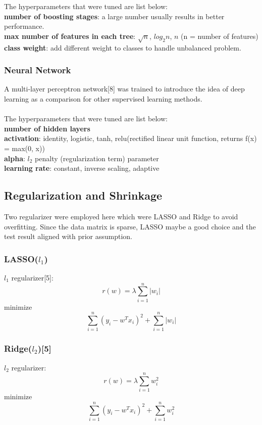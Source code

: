\documentclass{article}
\begin{document}
The hyperparameters that were tuned are list below:\\
\textbf{number of boosting stages}: a large number usually results in better performance.\\
\textbf{max number of features in each tree}: $\sqrt{n}$, $log_2{n}$, $n$ (n = number of features)\\
\textbf{class weight}: add different weight to classes to handle unbalanced problem.

\subsubsection{Neural Network}
A multi-layer perceptron network[8] was trained to introduce the idea of deep learning as a comparison for other supervised learning methods.\\
\\
The hyperparameters that were tuned are list below:\\
\textbf{number of hidden layers}\\
\textbf{activation}: identity, logistic, tanh, relu(rectified linear unit function, returns f(x) = max(0, x))\\
\textbf{alpha}: $l_2$ penalty (regularization term) parameter\\
\textbf{learning rate}: constant, inverse scaling, adaptive\\

\subsection{Regularization and Shrinkage}
Two regularizer were employed here which were LASSO and Ridge to avoid overfitting. Since the data matrix is sparse, LASSO maybe a good choice and the test result aligned with prior assumption.

\subsubsection{LASSO($l_1$)}
\noindent $l_1$ regularizer[5]:
$$r(w) = \lambda \sum_{i=1}^{n} |w_i|$$
minimize $$  \sum_{i=1}^{n} (y_i - w^Tx_i)^2 + \sum_{i=1}^{n} |w_i|$$

\subsubsection{Ridge($l_2$)[5]}
\noindent $l_2$ regularizer:
$$r(w) = \lambda \sum_{i=1}^{n} w_i^2$$
minimize $$  \sum_{i=1}^{n} (y_i - w^Tx_i)^2 + \sum_{i=1}^{n} w_i^2$$
\end{document}
